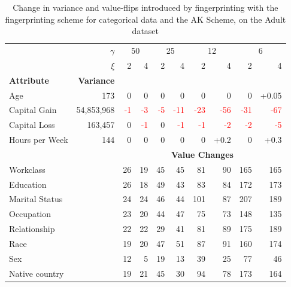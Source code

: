 \begin{table}[ht]
\centering
\caption{Change in variance and value-flips introduced by fingerprinting with the fingerprinting scheme for categorical data and the AK Scheme, on the Adult dataset}
\label{table:categorical-ak-mean}
\begin{tabular}{|l r|r r|r r|r r|r r|} 
 \hline
 & $\gamma$ & \multicolumn{2}{c|}{50} & \multicolumn{2}{c|}{25} & \multicolumn{2}{c|}{12} & \multicolumn{2}{c|}{6}
 \\ 
 & $\xi$ &2&4&2&4&2&4&2&4 \\

 \textbf{Attribute} & \textbf{Variance} & & & & & & & & \\
 \hline
 Age & 173 & 0 & 0 & 0 & 0 & 0 & 0 & 0 & +0.05 \\
 \hline
 Capital Gain & 54,853,968 & \textcolor{red}{-1} & \textcolor{red}{-3} & \textcolor{red}{-5} & \textcolor{red}{-11} & \textcolor{red}{-23} & \textcolor{red}{-56} & \textcolor{red}{-31} & \textcolor{red}{-67}\\
 \hline
 Capital Loss & 163,457 & 0 & \textcolor{red}{-1} & 0 & \textcolor{red}{-1} & \textcolor{red}{-1} & \textcolor{red}{-2} & \textcolor{red}{-2} & \textcolor{red}{-5} \\
 \hline
 Hours per Week & 144 & 0 & 0 & 0 & 0 & 0 & +0.2 & 0 & +0.3 \\
 \hline
  & & \multicolumn{8}{c|}{\textbf{Value Changes} }\\
\hline
 Workclass & & 26 & 19 & 45 & 45 & 81 & 90 & 165 & 165\\
 \hline
 Education && 26 & 18 & 49 &43 & 83 & 84 & 172 & 173\\
 \hline
 Marital Status && 24 & 24 & 46 & 44 & 101 & 87 & 207 & 189\\
 \hline
 Occupation && 23 & 20 & 44 & 47 & 75 & 73 & 148 & 135\\
 \hline
 Relationship && 22 & 22 & 29 & 41 & 81 & 89 & 175 & 189\\
 \hline
 Race && 19 & 20 & 47 & 51 & 87 & 91 & 160 & 174\\
 \hline
 Sex && 12 & 5 & 19 & 13 & 39 & 25 & 77 & 46\\
 \hline
 Native country && 19 & 21 & 45 & 30 & 94 & 78 & 173 & 164\\
 \hline
 \end{tabular}
 \end{table}

